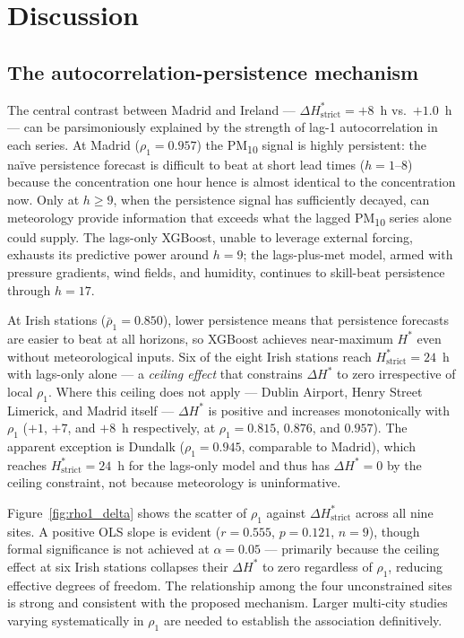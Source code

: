 \documentclass[12pt,a4paper]{article}
\newcommand{\PMten}{PM\textsubscript{10}}
\begin{document}
\section{Discussion}
\label{sec:discussion}

\subsection{The autocorrelation-persistence mechanism}

The central contrast between Madrid and Ireland — $\Delta H^*_{\text{strict}}
= +8$~h vs.\ $+1.0$~h — can be parsimoniously explained by the strength of
lag-1 autocorrelation in each series.  At Madrid ($\rho_1 = 0.957$) the
\PMten{} signal is highly persistent: the naïve persistence forecast is
difficult to beat at short lead times ($h = 1$--$8$) because the concentration
one hour hence is almost identical to the concentration now.  Only at
$h \ge 9$, when the persistence signal has sufficiently decayed, can
meteorology provide information that exceeds what the lagged \PMten{} series
alone could supply.  The lags-only XGBoost, unable to leverage external
forcing, exhausts its predictive power around $h = 9$; the lags-plus-met
model, armed with pressure gradients, wind fields, and humidity, continues to
skill-beat persistence through $h = 17$.

At Irish stations ($\bar{\rho}_1 = 0.850$), lower persistence means that
persistence forecasts are easier to beat at all horizons, so XGBoost achieves
near-maximum $H^*$ even without meteorological inputs.  Six of the eight Irish
stations reach $H^*_{\text{strict}} = 24$~h with lags-only alone — a
\emph{ceiling effect} that constrains $\Delta H^*$ to zero irrespective of
local $\rho_1$.  Where this ceiling does not apply — Dublin Airport, Henry
Street Limerick, and Madrid itself — $\Delta H^*$ is positive and increases
monotonically with $\rho_1$ ($+1$, $+7$, and $+8$~h respectively, at
$\rho_1 = 0.815$, $0.876$, and $0.957$).  The apparent exception is Dundalk ($\rho_1 = 0.945$,
comparable to Madrid), which reaches $H^*_{\text{strict}} = 24$~h for the
lags-only model and thus has $\Delta H^* = 0$ by the ceiling constraint, not
because meteorology is uninformative.

Figure~\ref{fig:rho1_delta} shows the scatter of $\rho_1$ against
$\Delta H^*_{\text{strict}}$ across all nine sites.  A positive OLS slope is
evident ($r = 0.555$, $p = 0.121$, $n = 9$), though formal significance is not achieved
at $\alpha = 0.05$ — primarily because the ceiling effect at six Irish
stations collapses their $\Delta H^*$ to zero regardless of $\rho_1$, reducing
effective degrees of freedom.  The relationship among the four unconstrained
sites is strong and consistent with the proposed mechanism.  Larger multi-city
studies varying systematically in $\rho_1$ are needed to establish the
association definitively.
\end{document}
